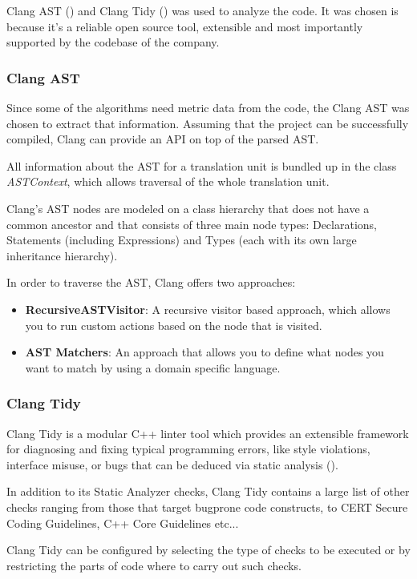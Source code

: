 Clang AST (\cite{clang_ast}) and Clang Tidy (\cite{clang_tidy}) was used to analyze the code. It was chosen is because it's a reliable open source tool, extensible and most importantly supported by the codebase of the company.

\subsubsection{Clang AST}
Since some of the algorithms need metric data from the code, the Clang AST was chosen to extract that information. Assuming that the project can be successfully compiled, Clang can provide an API on top of the parsed AST.  

All information about the AST for a translation unit is bundled up in the class \textit{ASTContext}, which allows traversal of the whole translation unit.

Clang’s AST nodes are modeled on a class hierarchy that does not have a common ancestor and that consists of three main node types: Declarations, Statements (including Expressions) and Types (each with its own large inheritance hierarchy).

In order to traverse the AST, Clang offers two approaches:
\begin{itemize}
	\item \textbf{RecursiveASTVisitor}: A recursive visitor based approach, which allows you to run custom actions based on the node that is visited.
	\item \textbf{AST Matchers}: An approach that allows you to define what nodes you want to match by using a domain specific language.
\end{itemize}

\subsubsection{Clang Tidy}

Clang Tidy is a modular C++ linter tool which provides an extensible framework for diagnosing and fixing typical programming errors, like style violations, interface misuse, or bugs that can be deduced via static analysis (\cite{clang_tidy}). 

In addition to its Static Analyzer checks, Clang Tidy contains a large list of other checks ranging from those that target bugprone code constructs, to CERT Secure Coding Guidelines, C++ Core Guidelines etc...

Clang Tidy can be configured by selecting the type of checks to be executed or by restricting the parts of code where to carry out such checks.

